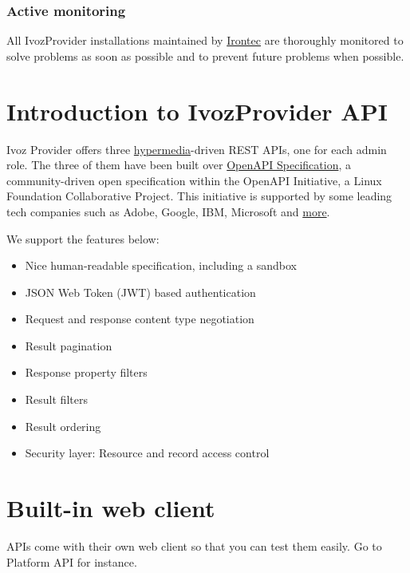 \documentclass[letterpaper,10pt,english]{sphinxmanual}
\begin{document}
\subsection{Active monitoring}
\label{security_and_maintenance/maintenance/other_tools:active-monitoring}
All IvozProvider installations maintained by \href{https://www.irontec.com}{Irontec} are thoroughly monitored to solve problems
as soon as possible and to prevent future problems when possible.


\chapter{Introduction to IvozProvider API}
\label{api_rest/introduction:introduction-to-ivozprovider-api}\label{api_rest/introduction::doc}
Ivoz Provider offers three \href{https://en.wikipedia.org/wiki/HATEOAS}{hypermedia}-driven REST APIs, one for each admin role. The three of them have been built over
\href{https://www.openapis.org/}{OpenAPI Specification}, a community-driven open specification within the OpenAPI
Initiative, a Linux Foundation Collaborative Project. This initiative is supported by some leading tech companies
such as Adobe, Google, IBM, Microsoft and \href{https://www.openapis.org/membership/members)}{more}.

We support the features below:
\begin{itemize}
\item {} 
Nice human-readable specification, including a sandbox

\item {} 
JSON Web Token (JWT) based authentication

\item {} 
Request and response content type negotiation

\item {} 
Result pagination

\item {} 
Response property filters

\item {} 
Result filters

\item {} 
Result ordering

\item {} 
Security layer: Resource and record access control

\end{itemize}


\chapter{Built-in web client}
\label{api_rest/web_client:built-in-web-client}\label{api_rest/web_client::doc}
APIs come with their own web client so that you can test them easily. Go to Platform API for instance.
\end{document}
